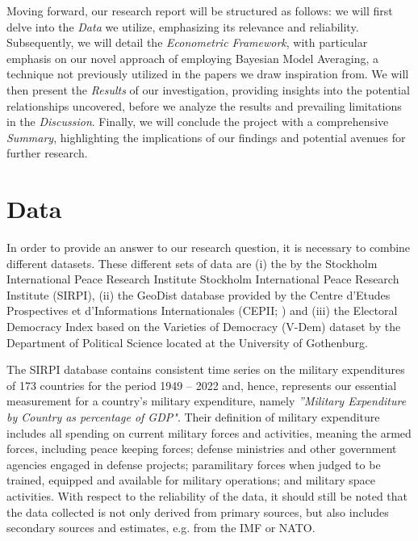 \documentclass[12pt,a4paper]{article}
\begin{document}
Moving forward, our research report will be structured as follows: we will first delve into the \textit{Data} we utilize, emphasizing its relevance and reliability. Subsequently, we will detail the \textit{Econometric Framework}, with particular emphasis on our novel approach of employing Bayesian Model Averaging, a technique not previously utilized in the papers we draw inspiration from. We will then present the \textit{Results} of our investigation, providing insights into the potential relationships uncovered, before we analyze the results and prevailing limitations in the \textit{Discussion}. Finally, we will conclude the project with a comprehensive \emph{Summary},
highlighting the implications of our findings and potential avenues for further research.

\section{Data}
In order to provide an answer to our research question, it is necessary to combine different datasets. These different sets of data are (i) the \citet{SIRPI} by the Stockholm International Peace Research Institute Stockholm International Peace Research Institute (SIRPI), (ii) the GeoDist database provided by the Centre d'Etudes Prospectives et d'Informations Internationales (CEPII; \citealp{mayer2011}) and (iii) the Electoral Democracy Index based on the Varieties of Democracy (V-Dem) dataset \citep{VDEM} by the Department of Political Science located at the University of Gothenburg. 

The SIRPI database contains consistent time series on the military expenditures of 173  countries for the period 1949 – 2022 and, hence, represents our essential measurement for a country's military expenditure, namely \textit{''Military Expenditure by Country as percentage of GDP"}. Their definition of military expenditure includes all spending on current military forces and activities, meaning the armed forces, including peace keeping forces; defense ministries and other government agencies engaged in defense projects; paramilitary forces when judged to be trained, equipped and available for military operations; and military space activities. With respect to the reliability of the data, it should still be noted that the data collected is not only derived from primary sources, but also includes secondary sources and estimates, e.g. from the IMF or NATO.
 
\end{document}
